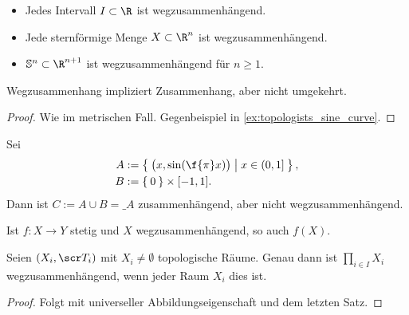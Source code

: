 \begin{ex}
	\begin{itemize}
		\item
			Jedes Intervall $I \subset \R$ ist wegzusammenhängend.
		\item
			Jede sternförmige Menge $X \subset \R^n$ ist wegzusammenhängend.
		\item
			$\S^n \subset \R^{n+1}$ ist wegzusammenhängend für $n \ge 1$.
	\end{itemize}
\end{ex}

\begin{st}
	Wegzusammenhang impliziert Zusammenhang, aber nicht umgekehrt.
	\begin{proof}
		Wie im metrischen Fall.
		Gegenbeispiel in \ref{ex:topologists_sine_curve}.
	\end{proof}
\end{st}

\begin{ex} \label{ex:topologists_sine_curve}
	Sei
	\begin{align*}
		A &:= \Set{ \big(x, \sin( \f {\pi}x)\big) | x \in (0,1] }, \\
		B &:= \Set{ 0 } \times [-1, 1].
	\end{align*}
	Dann ist $C := A \cup B = \_A$ zusammenhängend, aber nicht wegzusammenhängend.
\end{ex}


\begin{st}
	Ist $f: X \to Y$ stetig und $X$ wegzusammenhängend, so auch $f(X)$.
\end{st}

\begin{st}
	Seien $(X_i, \scr T_i)$ mit $X_i \neq \emptyset$ topologische Räume.
	Genau dann ist $\prod_{i \in I} X_i$ wegzusammenhängend, wenn jeder Raum $X_i$ dies ist.
	\begin{proof}
		Folgt mit universeller Abbildungseigenschaft und dem letzten Satz.
	\end{proof}
\end{st}

